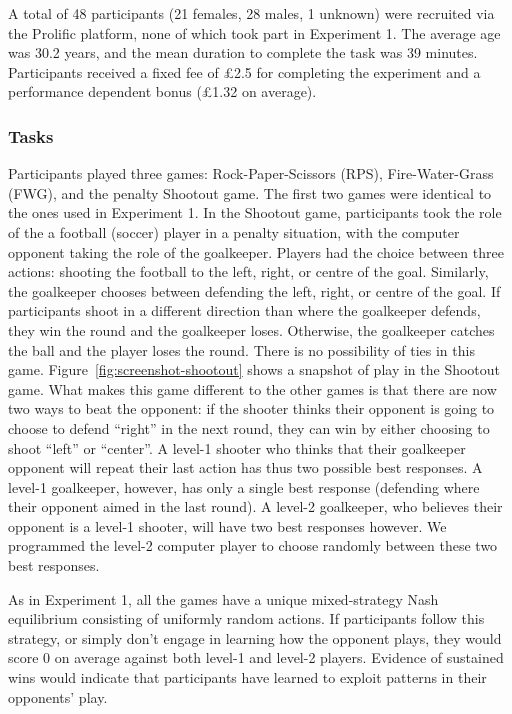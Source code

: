 \documentclass[man,floatsintext]{apa6}
\begin{document}
A total of 48 participants (21 females, 28 males, 1 unknown) were recruited via the Prolific platform, none of which took part in Experiment 1. The average age was 30.2 years, and the mean duration to complete the task was 39 minutes. Participants received a fixed fee of £2.5 for completing the experiment and a performance dependent bonus (£1.32 on average).

\hypertarget{tasks-1}{%
\subsubsection{Tasks}\label{tasks-1}}

Participants played three games: Rock-Paper-Scissors (RPS), Fire-Water-Grass (FWG), and the penalty Shootout game. The first two games were identical to the ones used in Experiment 1. In the Shootout game, participants took the role of the a football (soccer) player in a penalty situation, with the computer opponent taking the role of the goalkeeper. Players had the choice between three actions: shooting the football to the left, right, or centre of the goal. Similarly, the goalkeeper chooses between defending the left, right, or centre of the goal. If participants shoot in a different direction than where the goalkeeper defends, they win the round and the goalkeeper loses. Otherwise, the goalkeeper catches the ball and the player loses the round. There is no possibility of ties in this game. Figure~\ref{fig:screenshot-shootout} shows a snapshot of play in the Shootout game. What makes this game different to the other games is that there are now two ways to beat the opponent: if the shooter thinks their opponent is going to choose to defend \enquote{right} in the next round, they can win by either choosing to shoot \enquote{left} or \enquote{center}. A level-1 shooter who thinks that their goalkeeper opponent will repeat their last action has thus two possible best responses. A level-1 goalkeeper, however, has only a single best response (defending where their opponent aimed in the last round). A level-2 goalkeeper, who believes their opponent is a level-1 shooter, will have two best responses however. We programmed the level-2 computer player to choose randomly between these two best responses.

As in Experiment 1, all the games have a unique mixed-strategy Nash equilibrium consisting of uniformly random actions. If participants follow this strategy, or simply don't engage in learning how the opponent plays, they would score 0 on average against both level-1 and level-2 players. Evidence of sustained wins would indicate that participants have learned to exploit patterns in their opponents' play.
\end{document}
